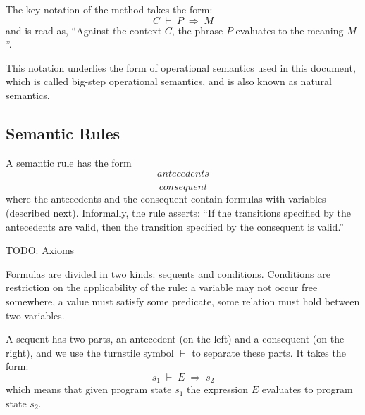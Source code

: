 \documentclass[10pt]{article}
\begin{document}
The key notation of the method takes the form: \begin{equation*}
C\;\vdash{}\;P\;\Rightarrow{}\;M\end{equation*}
 and is read as, ``Against the context $C$, the phrase $P$ evaluates to the meaning $M$''. 

This notation underlies the form of operational semantics used in
this document, which is called big-step operational semantics, and is
also known as natural semantics. 

\subsection*{Semantic Rules}
A semantic rule has the form \begin{equation*}
\frac{antecedents}%
{consequent}\end{equation*}
 where the antecedents and the consequent contain formulas with
variables (described next). Informally, the rule asserts: ``If the
transitions specified by the antecedents are valid, then the
transition specified by the consequent is valid.''  

TODO: Axioms

Formulas are divided in two kinds: sequents and conditions.
Conditions are restriction on the applicability of the rule: a
variable may not occur free somewhere, a value must satisfy some
predicate, some relation must hold between two variables.  

A sequent has two parts, an antecedent (on the left) and a
consequent (on the right), and we use the turnstile symbol $\vdash{}$ to separate these parts. It takes the form: \begin{equation*}
s_{1}\;\vdash{}\;E\;\Rightarrow{}\;s_{2}\end{equation*}
 which means that given program state $s_{1}$ the expression $E$ evaluates to program state $s_{2}$. 
\end{document}
